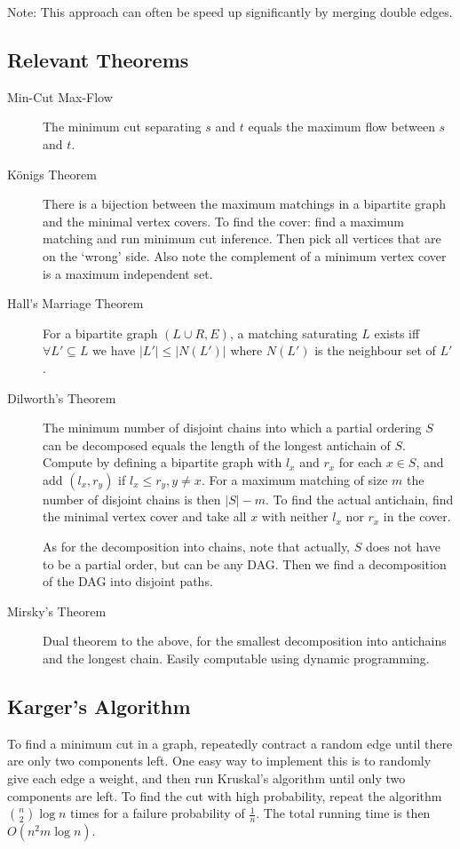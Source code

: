 \documentclass[
	a4paper,
	landscape,
	10pt,
	article
]{article}
\begin{document}
Note: This approach can often be speed up significantly by merging double
edges.

\subsection{Relevant Theorems}
\begin{description}
	\item[Min-Cut Max-Flow] The minimum cut separating $s$ and $t$ equals the
		maximum flow between $s$ and $t$.
	\item[K\"onigs Theorem] There is a bijection between the maximum matchings
		in a bipartite graph and the minimal vertex covers. To find the cover:
		find a maximum matching and run minimum cut inference. Then pick all
		vertices that are on the `wrong' side. Also note the complement of a
		minimum vertex cover is a maximum independent set.
	\item[Hall's Marriage Theorem] For a bipartite graph $(L \cup R, E)$, a
		matching saturating $L$ exists iff $\forall L' \subseteq L$ we have
		$|L'| \leq |N(L')|$ where $N(L')$ is the neighbour set of $L'$.
	\item[Dilworth's Theorem] The minimum number of disjoint chains into which
		a partial ordering $S$ can be decomposed equals the length of
		the longest antichain of
		$S$. Compute by defining a bipartite graph with $l_x$ and $r_x$ for
		each $x \in S$, and add $(l_x, r_y)$ if $l_x \leq r_y, y \neq x$. For
		a maximum matching of size $m$ the number of disjoint chains is then
		$|S|-m$. To find the actual antichain, find the minimal vertex cover
		and take all $x$ with neither $l_x$ nor $r_x$ in the cover.
		
		As for the decomposition into chains,
		note that actually, $S$ does not have to be a partial order, but can be
		any DAG. Then we find a decomposition of the DAG into disjoint paths.
	\item[Mirsky's Theorem] Dual theorem to the above, for the smallest
		decomposition into antichains and the longest chain. Easily computable
		using dynamic programming.
\end{description}

\subsection{Karger's Algorithm}
To find a minimum cut in a graph, repeatedly contract a random edge until there
are only two components left. One easy way to implement this is to randomly
give each edge a weight, and then run Kruskal's algorithm until only two
components are left. To find the cut with high probability, repeat the algorithm
$\binom{n}{2}\log{n}$ times for a failure probability of $\frac{1}{n}$. The
total running time is then $O(n^2 m \log{n})$.
\end{document}

